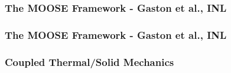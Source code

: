 \frame
{
  \frametitle{The MOOSE Framework - Gaston et al., INL}
  \begin{center}
  \end{center}
}






\frame
{
  \frametitle{The MOOSE Framework - Gaston et al., INL}
  \begin{center}
  \end{center}
}

\frame
{
  \frametitle{Coupled Thermal/Solid Mechanics}
  \begin{center}



  \end{center}
}


